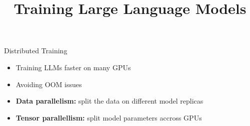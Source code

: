 



\newcommand{\learninggoals}{
\item Learn about different techniques to reduce compute and memory
\item Learn about distributed training with data/tensor parallelism
\item Learn about FlashAttention
}
\def\myblue#1{\textcolor{texblue}{#1}}

\title{Training Large Language Models}
\date{}







\begin{vbframe}{Distributed Training}

\vfill

\begin{itemize}
 	\item Training LLMs faster on many GPUs
 	\item Avoiding OOM issues
	\item \textbf{Data parallelism:} split the data on different model replicas
	\item \textbf{Tensor parallellism:} split model parameters accross GPUs
\end{itemize}

\vfill

\end{vbframe}

